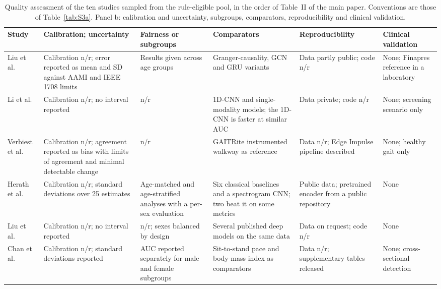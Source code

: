 \documentclass[journal]{IEEEtran}
\renewcommand{\thetable}{S\arabic{table}}
\begin{document}
\begin{table}[tbp]
\centering
\addtocounter{table}{-1}
\renewcommand{\thetable}{S5b}
\caption{Quality assessment of the ten studies sampled from the rule-eligible pool, in the order of
Table~II of the main paper. Conventions are those of Table~\ref{tab:S3a}. Panel b: calibration and uncertainty, subgroups, comparators, reproducibility and clinical validation.}
\label{tab:S5b}
\footnotesize
\setlength{\tabcolsep}{2.5pt}
\renewcommand{\arraystretch}{1.05}
\begin{tabularx}{\textwidth}{L{2.5cm} L{3.4cm} L{2.2cm} L{2.8cm} L{2.3cm} X}
\toprule
\textbf{Study} & \textbf{Calibration; uncertainty} & \textbf{Fairness or subgroups} & \textbf{Comparators} & \textbf{Reproducibility} & \textbf{Clinical validation} \\
\midrule
Liu et al.~\cite{liu2024cignn} & Calibration n/r; error reported as mean and SD against AAMI and IEEE 1708 limits & Results given across age groups & Granger-causality, GCN and GRU variants & Data partly public; code n/r & None; Finapres reference in a laboratory \\
\addlinespace[1pt]
Li et al.~\cite{li2026edgeischemia} & Calibration n/r; no interval reported & n/r & 1D-CNN and single-modality models; the 1D-CNN is faster at similar AUC & Data private; code n/r & None; screening scenario only \\
\addlinespace[1pt]
Verbiest et al.~\cite{verbiest2023gaitstride} & Calibration n/r; agreement reported as bias with limits of agreement and minimal detectable change & n/r & GAITRite instrumented walkway as reference & Data n/r; Edge Impulse pipeline described & None; healthy gait only \\
\addlinespace[1pt]
Herath et al.~\cite{herath2026parkinson} & Calibration n/r; standard deviations over 25 estimates & Age-matched and age-stratified analyses with a per-sex evaluation & Six classical baselines and a spectrogram CNN; two beat it on some metrics & Public data; pretrained encoder from a public repository & None \\
\addlinespace[1pt]
Liu et al.~\cite{liu2025sleepposture} & Calibration n/r; no interval reported & n/r; sexes balanced by design & Several published deep models on the same data & Data on request; code n/r & None \\
\addlinespace[1pt]
Chan et al.~\cite{chan2026sitstand} & Calibration n/r; standard deviations reported & AUC reported separately for male and female subgroups & Sit-to-stand pace and body-mass index as comparators & Data n/r; supplementary tables released & None; cross-sectional detection \\

\end{tabularx}
\end{table}
\end{document}
